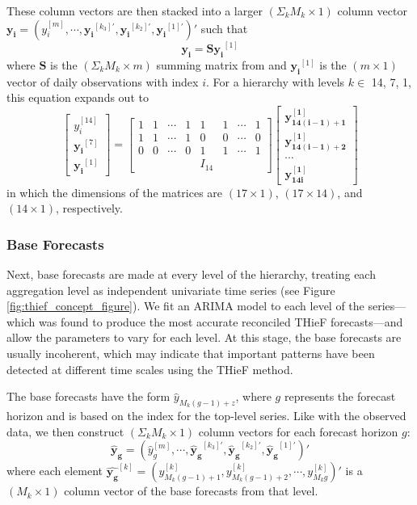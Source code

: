 \documentclass[12pt]{article}
\begin{document}
These column vectors are then stacked into a larger $(\Sigma_{k} M_k \times 1)$ column vector $\boldsymbol{y_i} = (y_i^{[m]}, \cdots, \boldsymbol{y_i}^{[k_3]'}, \boldsymbol{y_i}^{[k_2]'}, \boldsymbol{y_i}^{[1]'})'$ such that \[\boldsymbol{y_i} = \boldsymbol{S y_i}^{[1]}\] where $\boldsymbol{S}$ is the $(\Sigma_{k} M_k \times m)$ summing matrix from \cite{summing_matrix} and $\boldsymbol{y_i}^{[1]}$ is the $(m \times 1)$ vector of daily observations with index $i$. For a hierarchy with levels $k \in$ {14, 7, 1}, this equation expands out to
\[\begin{bmatrix} y_i^{[14]}\\ \boldsymbol{y_i}^{[7]}\\ \boldsymbol{y_i}^{[1]} \end{bmatrix} =
\begin{bmatrix}
1 & 1 & \cdots & 1 & 1 & 1 & \cdots & 1 \\
1 & 1 & \cdots & 1 & 0 & 0 & \cdots & 0 \\
0 & 0 & \cdots & 0 & 1 & 1 & \cdots & 1 \\
  &   &   &   & I_{14} &   &   &
\end{bmatrix}
\begin{bmatrix} \boldsymbol{y_{14(i-1)+1}^{[1]}}\\ \boldsymbol {y_{14(i-1)+2}^{[1]}}\\ \cdots\\ \boldsymbol{y_{14i}^{[1]}} \end{bmatrix}\] in which the dimensions of the matrices are $(17 \times 1)$, $(17 \times 14)$, and $(14 \times 1)$, respectively.

\subsubsection{Base Forecasts} \label{thief_base_forecasts}
Next, base forecasts are made at every level of the hierarchy, treating each aggregation level as independent univariate time series (see Figure \ref{fig:thief_concept_figure}). We fit an ARIMA model to each level of the series---which was found to produce the most accurate reconciled THieF forecasts\cite{thief}---and allow the parameters to vary for each level. At this stage, the base forecasts are usually incoherent, which may indicate that important patterns have been detected at different time scales using the THieF method.

The base forecasts have the form $\hat{y}_{M_k(g-1) + z}$, where $g$ represents the forecast horizon and is based on the index for the top-level series. Like with the observed data, we then construct $(\Sigma_k M_k \times 1)$ column vectors for each forecast horizon $g$: \[\boldsymbol{\hat{y}_g} = (\hat{y}_g^{[m]}, \cdots, \boldsymbol{\hat{y}_g}^{[k_3]'}, \boldsymbol{\hat{y}_g}^{[k_2]'}, \boldsymbol{\hat{y}_g}^{[1]'})'\] where each element $\boldsymbol{\hat{y_g}}^{[k]} = (y_{M_k(g-1)+1}^{[k]}, y_{M_k(g-1)+2}^{[k]}, \cdots, y_{M_kg}^{[k]})'$ is a $(M_k \times 1)$ column vector of the base forecasts from that level\cite{thief}.
\end{document}
